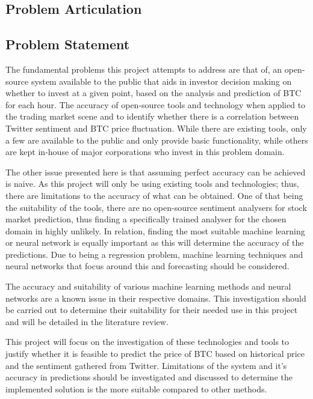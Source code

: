 \documentclass[oneside, 12pt]{article}
\begin{document}
	\newpage
	
	\begin{center}
		\section{Problem Articulation}\label{problem}
	\end{center}
		
		\subsection{Problem Statement}\label{statement}
		
		The fundamental problems this project attempts to address are that of, an open-source system available to the public that aids in investor decision making on whether to invest at a given point, based on the analysis and prediction of BTC for each hour. The accuracy of open-source tools and technology when applied to the trading market scene and to identify whether there is a correlation between Twitter sentiment and BTC price fluctuation. While there are existing tools, only a few are available to the public and only provide basic functionality, while others are kept in-house of major corporations who invest in this problem domain.
		
		The other issue presented here is that assuming perfect accuracy can be achieved is naive. As this project will only be using existing tools and technologies; thus, there are limitations to the accuracy of what can be obtained. One of that being the suitability of the tools, there are no open-source sentiment analysers for stock market prediction, thus finding a specifically trained analyser for the chosen domain in highly unlikely. In relation, finding the most suitable machine learning or neural network is equally important as this will determine the accuracy of the predictions. Due to being a regression problem, machine learning techniques and neural networks that focus around this and forecasting should be considered.
		
		The accuracy and suitability of various machine learning methods and neural networks are a known issue in their respective domains. This investigation should be carried out to determine their suitability for their needed use in this project and will be detailed in the literature review.
		
		This project will focus on the investigation of these technologies and tools to justify whether it is feasible to predict the price of BTC based on historical price and the sentiment gathered from Twitter. Limitations of the system and it's accuracy in predictions should be investigated and discussed to determine the implemented solution is the more suitable compared to other methods.  
		
\end{document}
